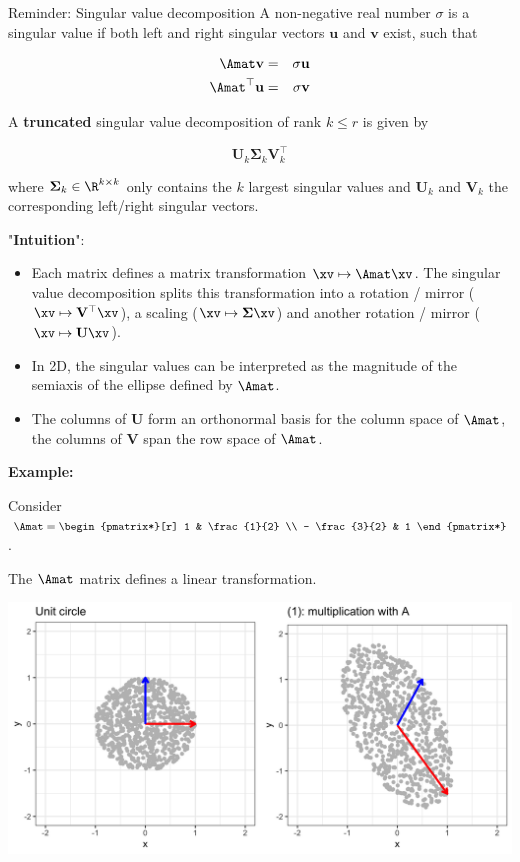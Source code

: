 \documentclass[11pt,compress,t,notes=noshow, xcolor=table]{beamer}
\begin{document}
\begin{vbframe}{Reminder: Singular value decomposition}
A non-negative real number $\sigma$ is a singular value if both left and right singular vectors $\mathbf{u}$ and $\mathbf{v}$ exist, such that

\begin{eqnarray*}
\Amat \mathbf{v} &=& \sigma \mathbf{u} \\
\Amat^\top \mathbf{u} &=& \sigma \mathbf{v}
\end{eqnarray*}


\framebreak

A \textbf{truncated} singular value decomposition of rank $k \le r$ is given by

$$
\mathbf{U}_k \boldsymbol{\Sigma}_k \mathbf{V}_k^\top
$$

where $\boldsymbol{\Sigma}_k \in \R^{k \times k}$ only contains the $k$ largest singular values and $\mathbf{U}_k$ and $\mathbf{V}_k$ the corresponding left/right singular vectors.

\framebreak

"\textbf{Intuition}":

\begin{itemize}
\item Each matrix defines a matrix transformation $\xv \mapsto \Amat \xv$. The singular value decomposition splits this transformation into a rotation / mirror ($\xv \mapsto \mathbf{V}^\top \xv$), a scaling ($\xv \mapsto \boldsymbol{\Sigma} \xv$) and another rotation / mirror ($\xv \mapsto \mathbf{U}\xv$).
\item In 2D, the singular values can be interpreted as the magnitude of the semiaxis of the ellipse defined by $\Amat$.
\item The columns of $\mathbf{U}$ form an orthonormal basis for the column space of $\Amat$, the columns of $\mathbf{V}$ span the row space of $\Amat$.
\end{itemize}

\framebreak

\textbf{Example:}

Consider $\Amat = \begin{pmatrix*}[r]
1 & \frac{1}{2} \\
- \frac{3}{2} & 1 \end{pmatrix*}$.

The $\Amat$ matrix defines a linear transformation.


\begin{center}
\includegraphics{figure_man/matrixabbildung.png}
\end{center}


\end{vbframe}
\end{document}
